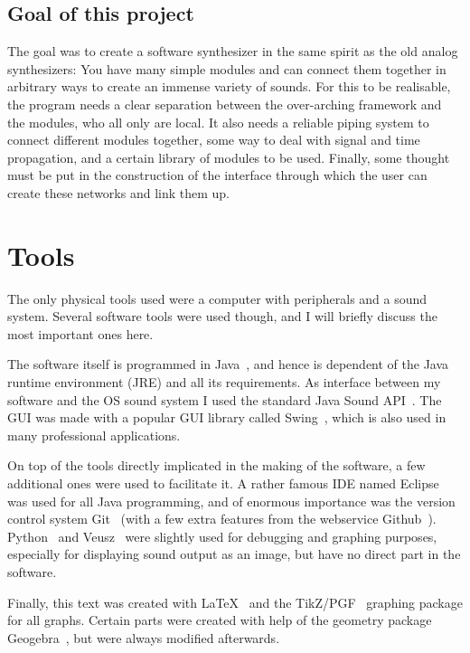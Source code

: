 \documentclass[11pt,a4paper]{article}
\begin{document}
\subsection{Goal of this project}

The goal was to create a software synthesizer in the same spirit as the old analog synthesizers: You have many simple modules and can connect them together in arbitrary ways to create an immense variety of sounds. For this to be realisable, the program needs a clear separation between the over-arching framework and the modules, who all only are local. It also needs a reliable piping system to connect different modules together, some way to deal with signal and time propagation, and a certain library of modules to be used. Finally, some thought must be put in the construction of the interface through which the user can create these networks and link them up.

\section{Tools}

The only physical tools used were a computer with peripherals and a sound system. Several software tools were used though, and I will briefly discuss the most important ones here.

The software itself is programmed in Java~\cite{Java}, and hence is dependent of the Java runtime environment (JRE) and all its requirements. As interface between my software and the OS sound system I used the standard Java Sound API~\cite{Javasound}. The GUI was made with a popular GUI library called Swing~\cite{Swing}, which is also used in many professional applications.

On top of the tools directly implicated in the making of the software, a few additional ones were used to fac‎ilitate it. A rather famous IDE named Eclipse~\cite{Eclipse} was used for all Java programming, and of enormous importance was the version control system Git~\cite{Git} (with a few extra features from the webservice Github~\cite{Github}). Python~\cite{Python} and Veusz~\cite{Veusz} were slightly used for debugging and graphing purposes, especially for displaying sound output as an image, but have no direct part in the software.

Finally, this text was created with LaTeX~\cite{Latex} and the TikZ/PGF~\cite{Tikz} graphing package for all graphs. Certain parts were created with help of the geometry package Geogebra~\cite{Geogebra}, but were always modified afterwards.
\end{document}

